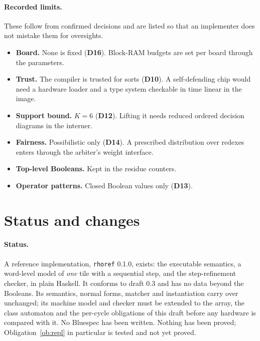 \documentclass[10.5pt,a4paper]{extarticle}
\newcommand{\kw}[1]{\texttt{#1}}
\newcommand{\dec}[1]{\textbf{D#1}}
\theoremstyle{definition}
\theoremstyle{remark}
\begin{document}
\paragraph{Recorded limits.} These follow from confirmed decisions and are
listed so that an implementer does not mistake them for oversights.
\begin{itemize}
\item \textbf{Board.} None is fixed (\dec{16}). Block-RAM budgets are set per
board through the parameters.
\item \textbf{Trust.} The compiler is trusted for sorts (\dec{10}). A
self-defending chip would need a hardware loader and a type system checkable
in time linear in the image.
\item \textbf{Support bound.} $K=6$ (\dec{12}). Lifting it needs reduced
ordered decision diagrams in the interner.
\item \textbf{Fairness.} Possibilistic only (\dec{14}). A prescribed
distribution over redexes enters through the arbiter's weight interface.
\item \textbf{Top-level Booleans.} Kept in the residue counters.
\item \textbf{Operator patterns.} Closed Boolean values only (\dec{13}).
\end{itemize}

\section{Status and changes}\label{sec:changes}

\paragraph{Status.} A reference implementation, \kw{rhoref} 0.1.0, exists:
the executable semantics, a word-level model of \emph{one} tile with a
sequential step, and the step-refinement checker, in plain Haskell. It
conforms to draft 0.3 and has no data beyond the Booleans. Its semantics, normal forms, matcher and
instantiation carry over unchanged; its machine model and checker must be
extended to the array, the class automaton and the per-cycle obligations of
this draft before any hardware is compared with it. No Bluespec has been
written. Nothing has been proved; Obligation~\ref{ob:repl} in particular is
tested and not yet proved.
\end{document}
